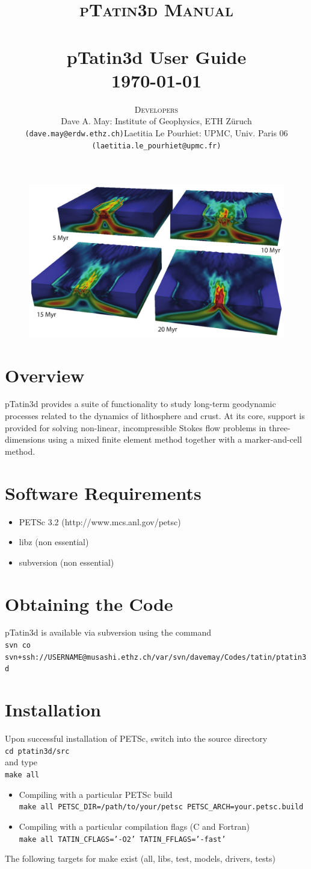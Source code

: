\documentclass[paper=a4, fontsize=11pt,twoside]{scrartcl}
\title{	\normalsize \textsc{pTatin3d Manual} 	%
	\\[2.0cm]									%
	\HRule{2pt} \\ [0.3cm]						%
	\LARGE \textbf{{pTatin3d User Guide}}			%
	\HRule{2pt} \\ [0.5cm]						%
	\normalsize \today							%
	}
\author{
{\normalsize \textsc{Developers}}
\begin{itemize}
\item[-] Dave A. May: Institute of Geophysics, ETH Z{\"u}ruch \texttt{(dave.may@erdw.ethz.ch)} 
\item[-] Laetitia Le Pourhiet: UPMC, Univ. Paris 06  \texttt{(laetitia.le\_pourhiet@upmc.fr)}
\end{itemize}
}
\makeatletter
\newcommand{\ptat}{{pTatin3d}}
\newcommand{\shellcmd}[1]{\\\indent\indent\texttt{\hspace{5mm}\footnotesize #1}\\}
\def\printtitle{%
    {
    	\centering \@title\par}
		 	\vspace{10mm}
	\begin{figure} [hbtp]
	\includegraphics[height=0.4\textheight]{figs/ptat3d_front_page.pdf}
	\end{figure}
    }
\def\printauthor{%
    {\centering \large \@author}}
\makeatother
\begin{document}
\thispagestyle{empty}%

\printtitle%
  	\vfill
\printauthor%




\newpage
{}
\tableofcontents{}

\newpage


\section{Overview}
{\ptat} provides a suite of functionality to study long-term geodynamic processes related to the dynamics of lithosphere and crust.
At its core, support is provided for solving non-linear, incompressible Stokes flow problems in three-dimensions using a mixed finite element method together with a marker-and-cell method.




\newpage
\section{Software Requirements}
\begin{itemize}
	\item PETSc 3.2 (http://www.mcs.anl.gov/petsc)
	\item libz (non essential)
	\item subversion (non essential)
\end{itemize}

\section{Obtaining the Code}
{\ptat} is available via subversion using the command
\shellcmd{svn co svn+ssh://USERNAME@musashi.ethz.ch/var/svn/davemay/Codes/tatin/ptatin3d}

\section{Installation}
Upon successful installation of PETSc, switch into the source directory
\shellcmd{cd ptatin3d/src}
and type \shellcmd{make all}
\begin{itemize}
	\item Compiling with a particular PETSc build
	\shellcmd{make all PETSC\_DIR=/path/to/your/petsc PETSC\_ARCH=your.petsc.build}
	\item Compiling with a particular compilation flags (C and Fortran)
	\shellcmd{make all TATIN\_CFLAGS='-O2' TATIN\_FFLAGS='-fast'}
\end{itemize}
The following targets for make exist (all, libs, test, models, drivers, tests)
\end{document}
